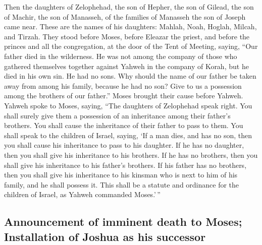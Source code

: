  Then the daughters of Zelophehad, the son of Hepher, the
son of Gilead, the son of Machir, the son of Manasseh, of the families
of Manasseh the son of Joseph came near. These are the names of his
daughters: Mahlah, Noah, Hoglah, Milcah, and Tirzah.  They
stood before Moses, before Eleazar the priest, and before the princes
and all the congregation, at the door of the Tent of Meeting, saying,
 ``Our father died in the wilderness. He was not among the
company of those who gathered themselves together against Yahweh in the
company of Korah, but he died in his own sin. He had no sons.
 Why should the name of our father be taken away from
among his family, because he had no son? Give to us a possession among
the brothers of our father.''  Moses brought their cause
before Yahweh.  Yahweh spoke to Moses, saying,
 ``The daughters of Zelophehad speak right. You shall
surely give them a possession of an inheritance among their father's
brothers. You shall cause the inheritance of their father to pass to
them.  You shall speak to the children of Israel, saying,
`If a man dies, and has no son, then you shall cause his inheritance to
pass to his daughter.  If he has no daughter, then you
shall give his inheritance to his brothers.  If he has no
brothers, then you shall give his inheritance to his father's brothers.
 If his father has no brothers, then you shall give his
inheritance to his kinsman who is next to him of his family, and he
shall possess it. This shall be a statute and ordinance for the children
of Israel, as Yahweh commanded Moses.'\,''

\hypertarget{announcement-of-imminent-death-to-moses-installation-of-joshua-as-his-successor}{%
\subsection{Announcement of imminent death to Moses; Installation of
Joshua as his
successor}\label{announcement-of-imminent-death-to-moses-installation-of-joshua-as-his-successor}}

